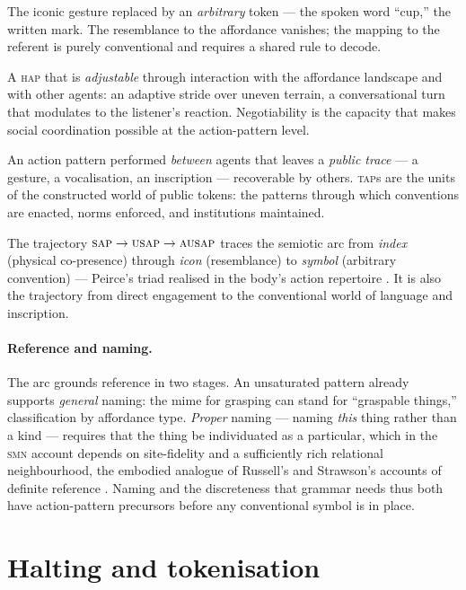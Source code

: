 \documentclass{article}
\newcommand{\smn}{\textsc{smn}}
\newcommand{\hap}{\textsc{hap}}
\newcommand{\sap}{\textsc{sap}}
\newcommand{\usap}{\textsc{usap}}
\newcommand{\ausap}{\textsc{ausap}}
\newcommand{\nap}{\textsc{nap}}
\newcommand{\tap}{\textsc{tap}}
\begin{document}
\begin{description}[leftmargin=2em,style=nextline]
\item[Arbitrary Unsaturated Action Pattern (\ausap)] The iconic gesture replaced by an \emph{arbitrary} token --- the spoken word ``cup,'' the written mark. The resemblance to the affordance vanishes; the mapping to the referent is purely conventional and requires a shared rule to decode.
\item[Negotiable Action Pattern (\nap)] A \hap{} that is \emph{adjustable} through interaction with the affordance landscape and with other agents: an adaptive stride over uneven terrain, a conversational turn that modulates to the listener's reaction. Negotiability is the capacity that makes social coordination possible at the action-pattern level.
\item[Transactional Action Pattern (\tap)] An action pattern performed \emph{between} agents that leaves a \emph{public trace} --- a gesture, a vocalisation, an inscription --- recoverable by others. \tap{}s are the units of the constructed world of public tokens: the patterns through which conventions are enacted, norms enforced, and institutions maintained.
\end{description}

The trajectory $\sap \to \usap \to \ausap$ traces the semiotic arc from \emph{index} (physical co-presence) through \emph{icon} (resemblance) to \emph{symbol} (arbitrary convention) --- Peirce's triad realised in the body's action repertoire \citep{peirce1992essential}. It is also the trajectory from direct engagement to the conventional world of language and inscription.

\paragraph{Reference and naming.} The arc grounds reference in two stages. An unsaturated pattern already supports \emph{general} naming: the mime for grasping can stand for ``graspable things,'' classification by affordance type. \emph{Proper} naming --- naming \emph{this} thing rather than a kind --- requires that the thing be individuated as a particular, which in the \smn{} account depends on site-fidelity and a sufficiently rich relational neighbourhood, the embodied analogue of Russell's and Strawson's accounts of definite reference \citep{Russell1905OnDenoting,Strawson1950Referring}. Naming and the discreteness that grammar needs thus both have action-pattern precursors before any conventional symbol is in place.

\section{Halting and tokenisation}\label{sec:tokenisation}
\end{document}
